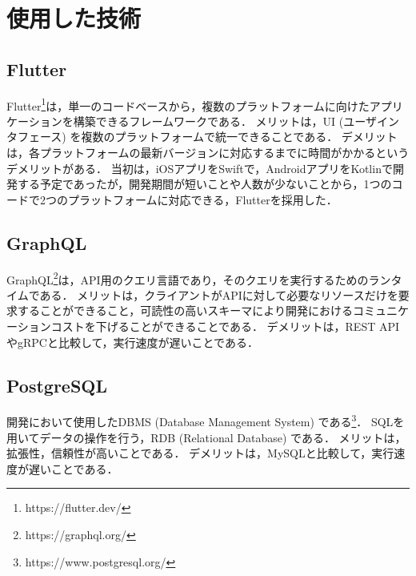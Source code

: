 \section{使用した技術}
\subsection{Flutter}
    Flutter\footnote{https://flutter.dev/}は，単一のコードベースから，複数のプラットフォームに向けたアプリケーションを構築できるフレームワークである．
    メリットは，UI (ユーザインタフェース) を複数のプラットフォームで統一できることである．
    デメリットは，各プラットフォームの最新バージョンに対応するまでに時間がかかるというデメリットがある．
    当初は，iOSアプリをSwiftで，AndroidアプリをKotlinで開発する予定であったが，開発期間が短いことや人数が少ないことから，1つのコードで2つのプラットフォームに対応できる，Flutterを採用した．

\subsection{GraphQL}
    GraphQL\footnote{https://graphql.org/}は，API用のクエリ言語であり，そのクエリを実行するためのランタイムである．
    メリットは，クライアントがAPIに対して必要なリソースだけを要求することができること，可読性の高いスキーマにより開発におけるコミュニケーションコストを下げることができることである．
    デメリットは，REST APIやgRPCと比較して，実行速度が遅いことである．

\subsection{PostgreSQL}
    開発において使用したDBMS (Database Management System) である\footnote{https://www.postgresql.org/}．
    SQLを用いてデータの操作を行う，RDB (Relational Database) である．
    メリットは，拡張性，信頼性が高いことである．
    デメリットは，MySQLと比較して，実行速度が遅いことである．
